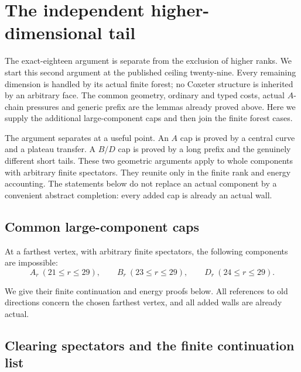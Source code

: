 \section{The independent higher-dimensional tail}
\label{app:highertail}
The exact-eighteen argument is separate from the exclusion of higher
ranks. We start this second argument at the published ceiling twenty-nine.
Every remaining dimension is handled by its actual finite forest; no
Coxeter structure is inherited by an arbitrary face. The common geometry,
ordinary and typed costs, actual $A$-chain pressures and generic prefix
are the lemmas already proved above. Here we supply the additional
large-component caps and then join the finite forest cases.

The argument separates at a useful point. An $A$ cap is proved by a
central curve and a plateau transfer. A $B/D$ cap is proved by a long
prefix and the genuinely different short tails. These two geometric
arguments apply to whole components with arbitrary finite spectators.
They reunite only in the finite rank and energy accounting. The
statements below do not replace an actual component by a convenient
abstract completion: every added cap is already an actual wall.

\subsection{Common large-component caps}
\begin{proposition}\label{app:tail:prop:caps}
At a farthest vertex, with arbitrary finite spectators, the following
components are impossible:
\[
 A_r\ (21\le r\le29),\qquad B_r\ (23\le r\le29),\qquad
 D_r\ (24\le r\le29).
\]
\end{proposition}

We give their finite continuation and energy proofs below. All references to old directions concern the
chosen farthest vertex, and all added walls are already actual.

\subsection{Clearing spectators and the finite continuation list}
\label{app:tail:sec:capinventory}


